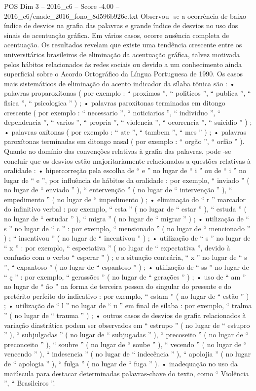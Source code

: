 \begin{textsample}{POS Dim 3 – 2016\_c6 – Score -4.00 – 2016\_c6/enade\_2016\_fono\_8d596b926e.txt}
Observou -se a ocorrência de baixo índice de desvios na grafia das palavras e grande índice de desvios no uso dos sinais de acentuação gráfica.
Em vários casos, ocorre ausência completa de acentuação.
Os resultados revelam que existe uma tendência crescente entre os universitários brasileiros de eliminação da acentuação gráfica, talvez motivada pelos hábitos relacionados às redes sociais ou devido a um conhecimento ainda superficial sobre o Acordo Ortográfico da Língua Portuguesa de 1990.
Os casos mais sistemáticos de eliminação do acento indicador da sílaba tônica são : • palavras proparoxítonas ( por exemplo : “ proximos ”, “ politicos ”, “ publica ”, “ fisica ”, “ psicologica ” ) ; • palavras paroxítonas terminadas em ditongo crescente ( por exemplo : “ necessario ”, “ noticiarios ”, “ individuo ”, “ dependencia ”, “ varios ”, “ propria ”, “ violencia ”, “ ocorrencia ”, “ suicidio ” ) ; • palavras oxítonas ( por exemplo : “ ate ”, “ tambem ”, “ mes ” ) ; • palavras paroxítonas terminadas em ditongo nasal ( por exemplo : “ orgão ”, “ orfão ” ).
Quanto ao domínio das convenções relativas à grafia das palavras, pode -se concluir que os desvios estão majoritariamente relacionados a questões relativas à oralidade : • hipercorreção pela escolha de “ e ” no lugar de “ i ” ou de “ i ” no lugar de “ e ”, por influência de hábitos da oralidade : por exemplo, “ inviado ” ( no lugar de “ enviado ” ), “ entervenção ” ( no lugar de “ intervenção ” ), “ empedimento ” ( no lugar de “ impedimento ) ; • eliminação do “ r ” marcador do infinitivo verbal : por exemplo, “ esta ” ( no lugar de “ estar ” ), “ estuda ” ( no lugar de “ estudar ” ), “ migra ” ( no lugar de “ migrar ” ) ; • utilização de “ s ” no lugar de “ c ” : por exemplo, “ mensionado ” ( no lugar de “ mencionado ” ) ; “ insentivou ” ( no lugar de “ incentivou ” ) ; • utilização de “ s ” no lugar de “ x ” : por exemplo, “ espectativa ” ( no lugar de “ expectativa ”, devido à confusão com o verbo “ esperar ” ) ; e a situação contrária, “ x ” no lugar de “ s ”, “ expantoso ” ( no lugar de “ espantoso ” ) ; • utilização de “ ss ” no lugar de “ ç ” : por exemplo, “ gerassões ” ( no lugar de “ gerações ” ) ; • uso de “ am ” no lugar de “ ão ” na forma de terceira pessoa do singular do presente e do pretérito perfeito do indicativo : por exemplo, “ estam ” ( no lugar de “ estão ” ) ; • utilização de “ l ” no lugar de “ u ” em final de sílaba : por exemplo, “ tralma ” ( no lugar de “ trauma ” ) ; • outros casos de desvios de grafia relacionados à variação diastrática podem ser observados em “ estrupo ” ( no lugar de “ estupro ” ), “ subjulgadas ” ( no lugar de “ subjugadas ” ), “ precoseito ” ( no lugar de “ preconceito ” ), “ soubre ” ( no lugar de “ soube ” ), “ vecendo ” ( no lugar de “ vencendo ” ), “ indesencia ” ( no lugar de “ indecência ” ), “ apolojia ” ( no lugar de “ apologia ” ), “ fulga ” ( no lugar de “ fuga ” ). • inadequação no uso da maiúscula para destacar determinadas palavras-chave do texto, como “ Violência ”, “ Brasileiros ”.

\end{textsample}
